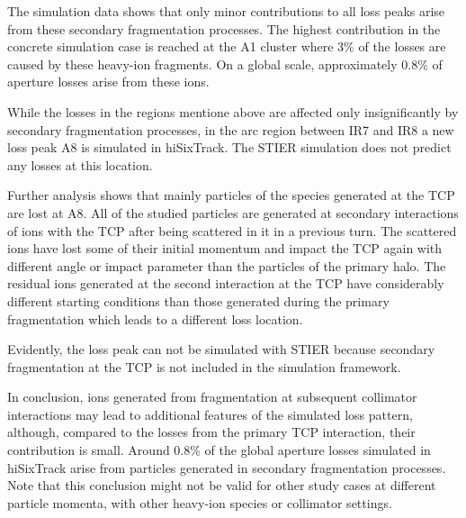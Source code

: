 The simulation data shows that only minor contributions to all loss peaks arise from these secondary fragmentation processes. The highest contribution in the concrete simulation case is reached at the A1 cluster where 3\% of the losses are caused by these heavy-ion fragments. On a global scale, approximately 0.8\% of aperture losses arise from these ions. 

While the losses in the regions mentione above are affected only insignificantly by secondary fragmentation processes, in the arc region between IR7 and IR8 a new loss peak A8 is simulated in hiSixTrack. The STIER simulation does not predict any losses at this location. 

Further analysis shows that mainly particles of the species  generated at the TCP are lost at A8. All of the studied particles are generated at secondary interactions of \lead ions with the TCP after being scattered in it in a previous turn. The scattered \lead ions have lost some of their initial momentum and impact the TCP again with different angle or impact parameter than the particles of the primary halo. The residual  ions generated at the second interaction at the TCP have considerably different starting conditions than those generated during the primary fragmentation which leads to a different loss location. 

Evidently, the loss peak can not be simulated with STIER because secondary fragmentation at the TCP is not included in the simulation framework. 

In conclusion, ions generated from fragmentation at subsequent collimator interactions may lead to additional features of the simulated loss pattern, although, compared to the losses from the primary TCP interaction, their contribution is small. Around 0.8\% of the global aperture losses simulated in hiSixTrack arise from particles generated in secondary fragmentation processes. Note that this conclusion might not be valid for other study cases at different particle momenta, with other heavy-ion species or collimator settings.
